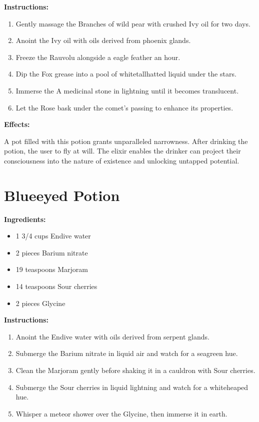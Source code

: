 \documentclass{article}
\begin{document}
\textbf{Instructions:}

\begin{enumerate}
  \item Gently massage the Branches of wild pear with crushed Ivy oil for two days.
  \item Anoint the Ivy oil with oils derived from phoenix glands.
  \item Freeze the Rauvolu alongside a eagle feather an hour.
  \item Dip the Fox grease into a pool of whitetallhatted liquid under the stars.
  \item Immerse the A medicinal stone in lightning until it becomes translucent.
  \item Let the Rose bask under the comet’s passing to enhance its properties.
\end{enumerate}

\textbf{Effects:}

A pot filled with this potion grants unparalleled narrowness. After drinking the potion, the user to fly at will. The elixir enables the drinker can project their consciousness into the nature of existence and unlocking untapped potential.

\newpage
\section*{Blueeyed Potion}

\textbf{Ingredients:}

\begin{itemize}
  \item 1 3/4 cups Endive water
  \item 2 pieces Barium nitrate
  \item 19 teaspoons Marjoram
  \item 14 teaspoons Sour cherries
  \item 2 pieces Glycine
\end{itemize}

\textbf{Instructions:}

\begin{enumerate}
  \item Anoint the Endive water with oils derived from serpent glands.
  \item Submerge the Barium nitrate in liquid air and watch for a seagreen hue.
  \item Clean the Marjoram gently before shaking it in a cauldron with Sour cherries.
  \item Submerge the Sour cherries in liquid lightning and watch for a whiteheaped hue.
  \item Whisper a meteor shower over the Glycine, then immerse it in earth.
\end{enumerate}
\end{document}
